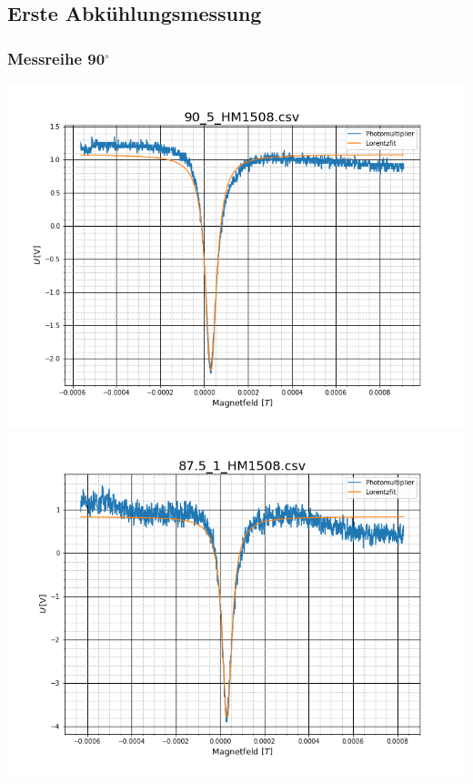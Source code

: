 \subsection{Erste Abkühlungsmessung}
\subsubsection{Messreihe 90$^\circ$}
\includegraphics[scale=0.3]{Bild/Anhang/Abkuhlung_1/abk_1_901}
\includegraphics[scale=0.3]{Bild/Anhang/Abkuhlung_1/abk_1_902}\\
